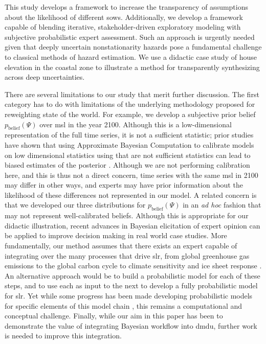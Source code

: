 \documentclass[11pt]{article}
\makeatletter
\DeclareRobustCommand\onedot{\futurelet\@let@token\@onedot}
\def\@onedot{\ifx\@let@token.\else.\null\fi\xspace}
\def\eg{\emph{e.g}\onedot} \def\Eg{\emph{E.g}\onedot}
\DeclareRobustCommand\onedot{\futurelet\@let@token\@onedot}
\def\@onedot{\ifx\@let@token.\else.\null\fi\xspace}
\def\eg{\emph{e.g}\onedot} \def\Eg{\emph{E.g}\onedot}
\makeatother
\begin{document}
This study develops a framework to increase the transparency of assumptions about the likelihood of different \glspl{sow}.
Additionally, we develop a framework capable of blending iterative, stakeholder-driven exploratory modeling with subjective probabilistic expert assessment.
Such an approach is urgently needed given that deeply uncertain nonstationarity hazards pose a fundamental challenge to classical methods of hazard estimation.
We use a didactic case study of house elevation in the coastal zone to illustrate a method for transparently synthesizing across deep uncertainties.

There are several limitations to our study that merit further discussion.
The first category has to do with limitations of the underlying methodology proposed for reweighting state of the world.
For example, we develop a subjective prior belief $p_\mathrm{belief}(\Psi)$ over \gls{msl} in the year 2100.
Although this is a low-dimensional representation of the full time series, it is not a sufficient statistic; prior studies have shown that using Approximate Bayesian Computation to calibrate models on low dimensional statistics using that are not sufficient statistics can lead to biased estimates of the posterior \citep{csillery_abc:2010,marjoram_abc:2006}.
Although we are not performing calibration here, and this is thus not a direct concern, time series with the same \gls{msl} in 2100 may differ in other ways, and experts may have prior information about the likelihood of these differences not represented in our model.
A related concern is that we developed our three distributions for $p_\mathrm{belief}(\Psi)$  in an \emph{ad hoc} fashion that may not represent well-calibrated beliefs.
Although this is appropriate for our didactic illustration, recent advances in Bayesian elicitation of expert opinion \citep[see][and references therein]{mikkola_elicitation:2021} can be applied to improve decision making in real world case studies.
More fundamentally, our method assumes that there exists an expert capable of integrating over the many processes that drive \gls{slr}, from global greenhouse gas emissions to the global carbon cycle to climate sensitivity and ice sheet response \citep{morgan_elicitation:2014}.
An alternative approach would be to build a probabilistic model for each of these steps, and to use each as input to the next to develop a fully probabilistic model for \gls{slr}.
Yet while some progress has been made developing probabilistic models for specific elements of this model chain \citep[\eg,][]{srikrishnan_probabilistic:2022,wong_brick0.2:2017}, this remains a computational and conceptual challenge.
Finally, while our aim in this paper has been to demonstrate the value of integrating Bayesian workflow \citep{gelman_workflow:2020} into \gls{dmdu}, further work is needed to improve this integration.
\end{document}
